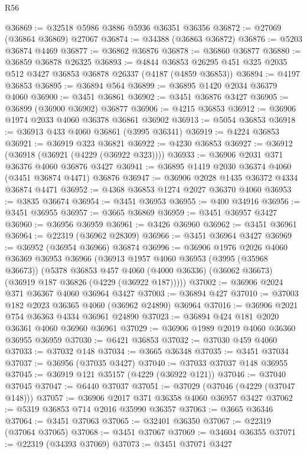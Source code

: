 \begin{lexlean}{R56}
\begin{coremodule}
@36869 := @32518 @5986 @3886 @5936 @36351 @36356
@36872 := @27069 (@36864 @36869) @27067
@36874 := @34388 (@36863 @36872)
@36876 := @5203 @36874 @4469
@36877 := @36862 @36876
@36878 := @36860 @36877
@36880 := @36859 @36878 @26325
@36893 := @4844 @36853 @26295 @451 @325 @2035 @512 @3427 @36853 @36878 @26337 (@4187 (@4859 @36853))
@36894 := @4197 @36853
@36895 := @36894 @564
@36899 := @36895 @1420 @2034 @36379 @4060
@36900 := @3451 @36861
@36902 := @3451 @36876 @3427
@36905 := @36899 (@36900 @36902) @36877
@36906 := @4215 @36853
@36912 := @36906 @1974 @2033 @4060 @36378 @36861 @36902
@36913 := @5054 @36853
@36918 := @36913 @433 @4060 @36861 (@3995 @36341)
@36919 := @4224 @36853
@36921 := @36919 @323 @36821
@36922 := @4230 @36853
@36927 := @36912 (@36918 (@36921 (@4229 (@36922 @323))))
@36933 := @36906 @2031 @371 @36376 @4060 @36876 @3427
@36941 := @36895 @1419 @2030 @36374 @4060 (@3451 @36874 @4471) @36876
@36947 := @36906 @2028 @1435 @36372 @4334 @36874 @4471
@36952 := @4368 @36853 @1274 @2027 @36370 @4060
@36953 := @3835 @36674
@36954 := @3451 @36953
@36955 := @400 @34916
@36956 := @3451 @36955
@36957 := @3665 @36869
@36959 := @3451 @36957 @3427
@36960 := @36956 @36959
@36961 := @3426 @36960
@36962 := @3451 @36961
@36964 := @22319 (@36962 @28309)
@36966 := @3451 @36964 @3427
@36969 := @36952 (@36954 @36966) @36874
@36996 := @36906
    @1976
    @2026
    @4060
    @36369
    @36953
    @36966
    (@36913
      @1957
      @4060
      @36953
      (@3995 (@35968 @36673))
      (@5378
        @36853
        @457
        @4060
        (@4000 @36336)
        (@36062 @36673)
        (@36919 @187 @36826 (@4229 (@36922 @187)))))
@37002 := @36906 @2024 @371 @36367 @4060 @36964 @3427
@37003 := @36894 @427
@37010 := @37003 @182 @2023 @36365 @4060 (@36962 @24890) @36964
@37016 := @36906 @2021 @754 @36363 @4334 @36961 @24890
@37023 := @36894 @424 @181 @2020 @36361 @4060 @36960 @36961
@37029 := @36906 @1989 @2019 @4060 @36360 @36955 @36959
@37030 := @6421 @36853
@37032 := @37030 @459 @4060
@37033 := @37032 @148
@37034 := @3665 @36348
@37035 := @3451 @37034
@37037 := @36956 (@37035 @3427)
@37040 := @37033 @37037 @148 @36955
@37045 := @36919 @121 @35157 (@4229 (@36922 @121))
@37046 := @37040 @37045
@37047 := @6440 @37037
@37051 := @37029 (@37046 (@4229 (@37047 @148)))
@37057 := @36906 @2017 @371 @36358 @4060 @36957 @3427
@37062 := @5319 @36853 @714 @2016 @35990 @36357
@37063 := @3665 @36346
@37064 := @3451 @37063
@37065 := @32401 @36350
@37067 := @22319 (@37064 @37065)
@37068 := @3451 @37067
@37069 := @34604 @36355
@37071 := @22319 (@34393 @37069)
@37073 := @3451 @37071 @3427

\end{coremodule}
\end{lexlean}
